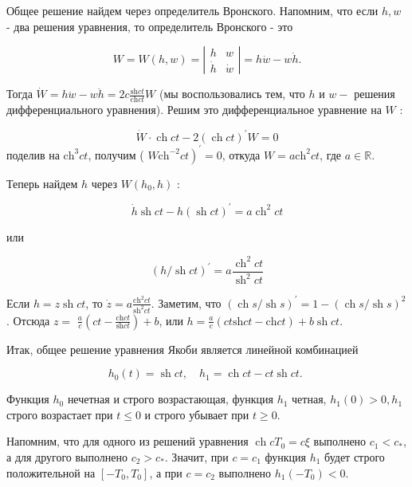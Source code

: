 \begin{task}
    Общее решение найдем через определитель Вронского. Напомним, что если $h, w$ - два решения уравнения, то определитель Вронского - это
    
    $$
    W=W(h, w)=\left|\begin{array}{cc}
    h & w \\
    \dot{h} & \dot{w}
    \end{array}\right|=h \dot{w}-w \dot{h} .
    $$
    
    Тогда $\dot{W}=h \ddot{w}-w \ddot{h}=2 c \frac{\mathrm{sh} c t}{\mathrm{ch} c t} W$ (мы воспользовались тем, что $h$ и $w-$ решения дифференциального уравнения). Решим это дифференциальное уравнение на $W$ :
    
    $$
    \dot{W} \cdot \operatorname{ch} c t-2(\operatorname{ch} c t)^{\prime} W=0
    $$
    поделив на $\mathrm{ch}^{3} c t$, получим ( $\left.W \mathrm{ch}^{-2} c t\right)^{\prime}=0$, откуда $W=a \mathrm{ch}^{2} c t$, где $a \in \mathbb{R}$.
    
    Теперь найдем $h$ через $W\left(h_{0}, h\right)$ :
    
    $$
    \dot{h} \operatorname{sh} c t-h(\operatorname{sh} c t)^{\prime}=a \operatorname{ch}^{2} c t
    $$
    
    или
    
    $$
    (h / \operatorname{sh} c t)^{\prime}=a \frac{\operatorname{ch}^{2} c t}{\operatorname{sh}^{2} c t}
    $$
    
    Если $h=z \operatorname{sh} c t$, то $\dot{z}=a \frac{\mathrm{ch}^{2} c t}{\mathrm{sh}^{2} c t}$. Заметим, что $(\operatorname{ch} s / \operatorname{sh} s)^{\prime}=1-(\operatorname{ch} s / \operatorname{sh} s)^{2}$. Отсюда $z=$ $\frac{a}{c}\left(c t-\frac{\mathrm{ch} c t}{\mathrm{sh} c t}\right)+b$, или $h=\frac{a}{c}(c t \mathrm{sh} c t-\mathrm{ch} c t)+b \operatorname{sh} c t$.
    
    Итак, общее решение уравнения Якоби является линейной комбинацией
    
    $$
    h_{0}(t)=\operatorname{sh} c t, \quad h_{1}=\operatorname{ch} c t-c t \operatorname{sh} c t \text {. }
    $$
    
    Функция $h_{0}$ нечетная и строго возрастающая, функция $h_{1}$ четная, $h_{1}(0)>0, h_{1}$ строго возрастает при $t \leq 0$ и строго убывает при $t \geq 0$.
    
    Напомним, что для одного из решений уравнения $\operatorname{ch} c T_{0}=c \xi$ выполнено $c_{1}<c_{*}$, а для другого выполнено $c_{2}>c_{*}$. Значит, при $c=c_{1}$ функция $h_{1}$ будет строго положительной на $\left[-T_{0}, T_{0}\right]$, а при $c=c_{2}$ выполнено $h_{1}\left(-T_{0}\right)<0$.
    

\end{task}
